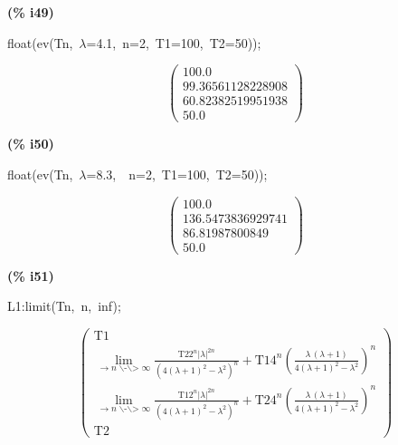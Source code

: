 \documentclass[fleqn]{article}
\begin{document}
\noindent
\begin{minipage}[t]{4.000000em}\color{red}\bfseries
(\% i49)	
\end{minipage}
\begin{minipage}[t]{\textwidth}\color{blue}
float(ev(Tn,\ \ensuremath{\lambda}=4.1,\ n=2,\ T1=100,\ T2=50));
\end{minipage}
\[\displaystyle \tag{\% o49} 
\begin{pmatrix}100.0\\
99.36561128228908\\
60.82382519951938\\
50.0\end{pmatrix}\mbox{}
\]


\noindent
\begin{minipage}[t]{4.000000em}\color{red}\bfseries
(\% i50)	
\end{minipage}
\begin{minipage}[t]{\textwidth}\color{blue}
float(ev(Tn,\ \ensuremath{\lambda}=8.3,\ \ n=2,\ T1=100,\ T2=50));
\end{minipage}
\[\displaystyle \tag{\% o50} 
\begin{pmatrix}100.0\\
136.5473836929741\\
86.81987800849\\
50.0\end{pmatrix}\mbox{}
\]


\noindent
\begin{minipage}[t]{4.000000em}\color{red}\bfseries
(\% i51)	
\end{minipage}
\begin{minipage}[t]{\textwidth}\color{blue}
L1:limit(Tn,\ n,\ inf);
\end{minipage}
\[\displaystyle \tag{\% o51} 
\begin{pmatrix}\ensuremath{\mathrm{T1}}\\
\lim_{\to n\operatorname{\backslash -\backslash >  }\infty }{\frac{\ensuremath{\mathrm{T2}} {{2}^{n}} {{\left| \lambda \right| }^{2 n}}}{{{\left( 4 {{\left( \lambda +1\right) }^{2}}-{{\lambda }^{2}}\right) }^{n}}}+\ensuremath{\mathrm{T1}} {{4}^{n}} {{\left( \frac{\lambda \, \left( \lambda +1\right) }{4 {{\left( \lambda +1\right) }^{2}}-{{\lambda }^{2}}}\right) }^{n}}}\\
\lim_{\to n\operatorname{\backslash -\backslash >  }\infty }{\frac{\ensuremath{\mathrm{T1}} {{2}^{n}} {{\left| \lambda \right| }^{2 n}}}{{{\left( 4 {{\left( \lambda +1\right) }^{2}}-{{\lambda }^{2}}\right) }^{n}}}+\ensuremath{\mathrm{T2}} {{4}^{n}} {{\left( \frac{\lambda \, \left( \lambda +1\right) }{4 {{\left( \lambda +1\right) }^{2}}-{{\lambda }^{2}}}\right) }^{n}}}\\
\ensuremath{\mathrm{T2}}\end{pmatrix}\mbox{}
\]
\end{document}
